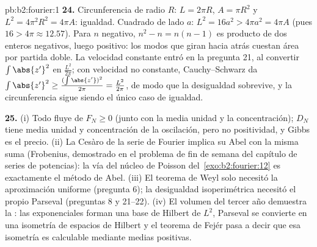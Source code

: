 \begin{solution}{pb:b2:fourier:1}
\textbf{24.} Circunferencia de radio $R$: $L = 2\pi R$, $A = \pi R^2$
y $L^2 = 4\pi^2R^2 = 4\pi A$: igualdad. Cuadrado de lado $a$: $L^2 =
16a^2 > 4\pi a^2 = 4\pi A$ (pues $16 > 4\pi \approx 12.57$). Para $n$
negativo, $n^2 - n = n(n - 1)$ es producto de dos enteros negativos,
luego positivo: los modos que giran hacia atrás cuestan área por
partida doble. La velocidad constante entró en la pregunta 21, al
convertir $\int\abs{z'}^2$ en $\frac{L^2}{2\pi}$; con velocidad no
constante, Cauchy--Schwarz da $\int\abs{z'}^2 \geq
\frac{(\int\abs{z'})^2}{2\pi} = \frac{L^2}{2\pi}$, de modo que la
desigualdad sobrevive, y la circunferencia sigue siendo el único caso
de igualdad.

\textbf{25.} (i) Todo fluye de $F_N \geq 0$ (junto con la media
unidad y la concentración); $D_N$ tiene media unidad y concentración
de la oscilación, pero no positividad, y Gibbs es el precio. (ii) La
 Cesàro de la serie de Fourier implica su
 Abel con la misma suma (Frobenius, demostrado en el
problema de fin de semana del capítulo de series de potencias): la
vía del núcleo de Poisson del~\cref{exo:b2:fourier:12} es exactamente
el método de Abel. (iii) El teorema de Weyl solo necesitó la
aproximación uniforme (pregunta 6); la desigualdad isoperimétrica
necesitó el propio Parseval (preguntas 8 y 21--22). (iv) El volumen
del tercer año demuestra la : las exponenciales forman una
base de Hilbert de $L^2$, Parseval se convierte en una isometría de
espacios de Hilbert y el teorema de Fejér pasa a decir que esa
isometría es calculable mediante medias positivas.
\end{solution}

